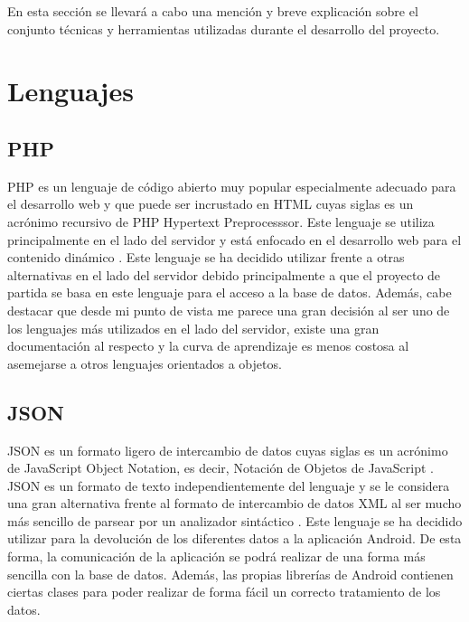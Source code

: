 
En esta sección se llevará a cabo una mención y breve explicación sobre el conjunto técnicas y herramientas utilizadas durante el desarrollo del proyecto.

\section{Lenguajes}

\subsection{PHP}

PHP es un lenguaje de código abierto muy popular especialmente adecuado para el desarrollo web y que puede ser incrustado en HTML \cite{wiki:php} cuyas siglas es un acrónimo recursivo de PHP Hypertext Preprocesssor. Este lenguaje se utiliza principalmente en el lado del servidor y está enfocado en el desarrollo web para el contenido dinámico \cite{wiki:php2}.
Este lenguaje se ha decidido utilizar frente a otras alternativas en el lado del servidor debido principalmente a que el proyecto de partida se basa en este lenguaje para el acceso a la base de datos. Además, cabe destacar que desde mi punto de vista me parece una gran decisión al ser uno de los lenguajes más utilizados en el lado del servidor, existe una gran documentación al respecto y la curva de aprendizaje es menos costosa al asemejarse a otros lenguajes orientados a objetos.

\subsection{JSON}

JSON es un formato ligero de intercambio de datos cuyas siglas es un acrónimo de JavaScript Object Notation, es decir, Notación de Objetos de JavaScript \cite{wiki:json}. JSON es un formato de texto independientemente del lenguaje y se le considera una gran alternativa frente al formato de intercambio de datos XML al ser mucho más sencillo de parsear por un analizador sintáctico \cite{wiki:json2}.
Este lenguaje se ha decidido utilizar para la devolución de los diferentes datos a la aplicación Android. De esta forma, la comunicación de la aplicación se podrá realizar de una forma más sencilla con la base de datos. Además, las propias librerías de Android contienen ciertas clases para poder realizar de forma fácil un correcto tratamiento de los datos.

